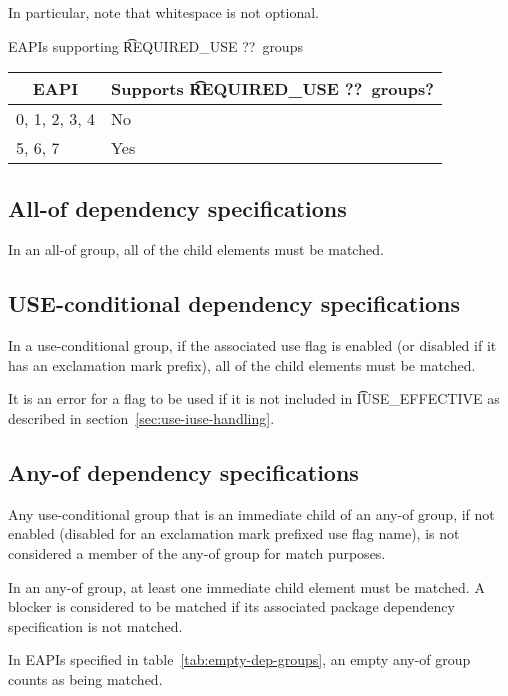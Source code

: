 In particular, note that whitespace is not optional.

\begin{centertable}{EAPIs supporting \t{REQUIRED_USE ??}\ groups}
    \label{tab:at-most-one-of-table}
    \begin{tabular}{ll}
      \toprule
      \multicolumn{1}{c}{\textbf{EAPI}} &
      \multicolumn{1}{c}{\textbf{Supports \t{REQUIRED_USE ??}\ groups?}} \\
      \midrule
      0, 1, 2, 3, 4     & No  \\
      5, 6, 7           & Yes \\
      \bottomrule
    \end{tabular}
\end{centertable}

\subsection{All-of dependency specifications}

In an all-of group, all of the child elements must be matched.

\subsection{USE-conditional dependency specifications}

In a use-conditional group, if the associated use flag is enabled (or disabled if it has an
exclamation mark prefix), all of the child elements must be matched.

It is an error for a flag to be used if it is not included in \t{IUSE_EFFECTIVE} as described in
section~\ref{sec:use-iuse-handling}.

\subsection{Any-of dependency specifications}

Any use-conditional group that is an immediate child of an any-of group, if not enabled (disabled
for an exclamation mark prefixed use flag name), is not considered a member of the any-of group
for match purposes.

In an any-of group, at least one immediate child element must be matched. A blocker is
considered to be matched if its associated package dependency specification is not matched.

 In EAPIs specified in table~\ref{tab:empty-dep-groups}, an empty
any-of group counts as being matched.

